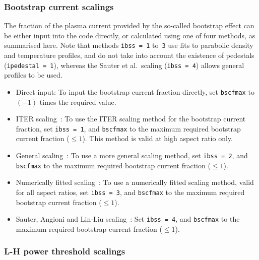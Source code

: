 \documentclass[11pt,a4paper]{report}
\begin{document}
\subsubsection{Bootstrap current scalings}
\label{sec:bootstrap}

The fraction of the plasma current provided by the so-called bootstrap effect
can be either input into the code directly, or calculated using one of four
methods, as summarised here. Note that methods \texttt{ibss = 1} to~\texttt{3}
use fits to parabolic density and temperature profiles, and do not take into
account the existence of pedestals (\texttt{ipedestal = 1}), whereas the
Sauter et al.\ scaling (\texttt{ibss = 4}) allows general profiles to be used.

\begin{itemize}

\item Direct input: To input the bootstrap current fraction directly, set
  \texttt{bscfmax} to $(-1)$ times the required value.

\item ITER scaling~\cite{IPDG}: To use the ITER scaling method for the
  bootstrap current fraction, set \texttt{ibss = 1}, and \texttt{bscfmax} to
  the maximum required bootstrap current fraction ($\leq 1$). This method is
  valid at high aspect ratio only.

\item General scaling~\cite{Nevins}: To use a more general scaling method, set
  \texttt{ibss = 2}, and \texttt{bscfmax} to the maximum required bootstrap
  current fraction ($\leq 1$).

\item Numerically fitted scaling~\cite{WilsonBS}: To use a numerically fitted
  scaling method, valid for all aspect ratios, set \texttt{ibss = 3}, and
  \texttt{bscfmax} to the maximum required bootstrap current fraction ($\leq
  1$).

\item Sauter, Angioni and Lin-Liu scaling~\cite{SauterBS, SauterBS_errata}:
  Set \texttt{ibss = 4}, and \texttt{bscfmax} to the maximum required
  bootstrap current fraction ($\leq 1$).

\end{itemize}

\subsubsection{L-H power threshold scalings}
\end{document}
